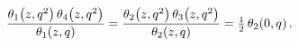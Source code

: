 \[\frac{\mathop{\theta_{1}\/}\nolimits\!\left(z,q^{2}\right)\mathop{\theta_{4}\/%
}\nolimits\!\left(z,q^{2}\right)}{\mathop{\theta_{1}\/}\nolimits\!\left(z,q%
\right)}=\frac{\mathop{\theta_{2}\/}\nolimits\!\left(z,q^{2}\right)\mathop{%
\theta_{3}\/}\nolimits\!\left(z,q^{2}\right)}{\mathop{\theta_{2}\/}\nolimits\!%
\left(z,q\right)}=\tfrac{1}{2}\mathop{\theta_{2}\/}\nolimits\!\left(0,q\right).\]